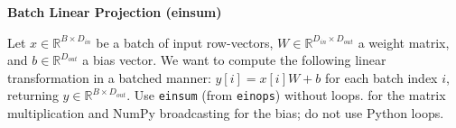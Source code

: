 \item {} \textbf{Batch Linear Projection (einsum)}

Let $x \in \mathbb{R}^{B\times D_{in}}$ be a batch of input row-vectors, $W \in \mathbb{R}^{D_{in}\times D_{out}}$ a weight matrix, and $b \in \mathbb{R}^{D_{out}}$ a bias vector. We want to compute the following linear transformation in a batched manner:
$y[i] = x[i] W + b$ for each batch index $i$, returning $y \in \mathbb{R}^{B\times D_{out}}$.
Use \texttt{einsum} (from \texttt{einops}) without loops. for the matrix multiplication and NumPy broadcasting for the bias; do not use Python loops.
    
